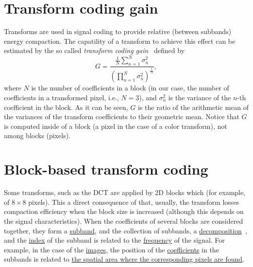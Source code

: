 
\section{Transform coding gain}

Transforms are used in signal coding to provide relative (between
subbands) energy compaction. The capatility of a transform to achieve
this effect can be estimated by the so called \emph{transform coding
gain}~\cite{vetterli1995wavelets,sayood2017introduction} defined by
\begin{equation}
G = \frac{\frac{1}{N}\sum_{n=1}^N{\sigma_n^2}}{(\prod_{n=1}^N\sigma_n^2)^{\frac{1}{N}}},
\end{equation}
where $N$ is the number of coefficients in a block (in our case, the
number of coefficients in a transformed pixel, i.e., $N=3$), and
$\sigma_n^2$ is the variance of the $n$-th coefficient in the
block. As it can be seen, $G$ is the ratio of the arithmetic mean of
the variances of the transform coefficients to their geometric
mean. Notice that $G$ is computed inside of a block (a pixel in the
case of a color transform), not among blocks (pixels).


\section{Block-based transform coding}

Some transforms, such as the DCT are applied by 2D blocks which (for
example, of $8\times 8$ pixels). This a direct consequence of that,
usually, the transform losses compaction efficiency when the block size is
increased (although this depends on the signal characteristics). When
the coefficients of several blocks are considered together, they form
a \href{https://en.wikipedia.org/wiki/Sub-band_coding}{subband}, and
the collection of subbands, a
\href{https://en.wikipedia.org/wiki/Discrete_wavelet_transform}{decomposition}~\cite{vetterli2014foundations},
and the
\href{https://en.wikipedia.org/wiki/Array_data_structure#Element_identifier_and_addressing_formulas}{index}
of the subband is related to the
\href{https://en.wikipedia.org/wiki/Frequency}{frequency} of the
signal. For example, in the case of the
\href{https://en.wikipedia.org/wiki/Digital_image}{images}, the
position of the
\href{https://en.wikipedia.org/wiki/Coefficient}{coefficients} in the
subbands is related to
\href{https://github.com/Sistemas-Multimedia/Sistemas-Multimedia.github.io/blob/master/milestones/07-DCT/block_DCT_compression.ipynb}{the
  spatial area where the corresponding pixels are found}.

